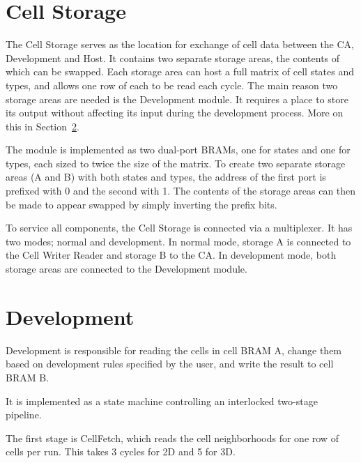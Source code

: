 
\section{Cell Storage}


The Cell Storage serves as the location for exchange of cell data between the CA, Development and Host.
It contains two separate storage areas, the contents of which can be swapped.
Each storage area can host a full matrix of cell states and types, and allows one row of each to be read each cycle.
The main reason two storage areas are needed is the Development module.
It requires a place to store its output without affecting its input during the development process.
More on this in Section~\ref{sec:development}.

The module is implemented as two dual-port BRAMs, one for states and one for types, each sized to twice the size of the matrix.
To create two separate storage areas (A and B) with both states and types, the address of the first port is prefixed with 0 and the second with 1.
The contents of the storage areas can then be made to appear swapped by simply inverting the prefix bits.

To service all  components, the Cell Storage is connected via a multiplexer.
It has two modes; normal and development.
In normal mode, storage A is connected to the Cell Writer Reader and storage B to the CA.
In development mode, both storage areas are connected to the Development module.



\section{Development}
\label{sec:development}

Development is responsible for reading the cells in cell BRAM A, change them based on development rules specified by the user, and write the result to cell BRAM B.

It is implemented as a state machine controlling an interlocked two-stage pipeline.

The first stage is CellFetch, which reads the cell neighborhoods for one row of cells per run.
This takes 3 cycles for 2D and 5 for 3D.

